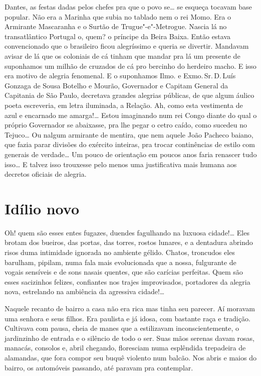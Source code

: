 Dantes, as festas dadas pelos chefes pra que o povo se\ldots{} se esqueça
tocavam base popular. Não era a Marinha que subia no tablado nem o rei
Momo. Era o Armirante Mascaranha e o Surtão de Trugue"-e"-Metrogue. Nascia
lá no transatlântico Portugal o, quem? o príncipe da Beira Baixa. Então
estava convencionado que o brasileiro ficou alegríssimo e queria se
divertir. Mandavam avisar de lá que os coloniais de cá tinham que mandar
pra lá um presente de suponhamos um milhão de cruzados de cá pro
bercinho do herdeiro macho. E isso era motivo de alegria fenomenal. E o
suponhamos Ilmo. e Exmo.\,Sr.\,D.\,Luís Gonzaga de Sousa Botelho e Mourão,
Governador e Capitam General da Capitania de São Paulo, decretava
grandes alegrias públicas, de que algum áulico poeta escreveria, em
letra iluminada, a Relação. Ah, como esta vestimenta de azul e encarnado
me amarga!\ldots{} Estou imaginando num rei Congo diante do qual o próprio
Governador se abaixasse, pra lhe pegar o cetro caído, como sucedeu no
Tejuco\ldots{} Ou nalgum armirante de mentira, que nem aquele João Pacheco
baiano, que fazia parar divisões do exército inteiras, pra trocar
continências de estilo com generais de verdade\ldots{} Um pouco de orientação
em poucos anos faria renascer tudo isso\ldots{} E talvez isso trouxesse pelo
menos uma justificativa mais humana aos decretos oficiais de alegria.

\chapter{Idílio novo}

Oh! quem são esses entes fugazes, duendes fagulhando na luxuosa
cidade!\ldots{} Eles brotam dos bueiros, das portas, das torres, rostos
lunares, e a dentadura abrindo risos duma intimidade ignorada no
ambiente gélido. Chatos, troncudos eles barulham, pipilam, numa fala
mais evolucionada que a nossa, fulgurante de vogais sensíveis e de sons
nasais quentes, que são carícias perfeitas. Quem são esses sacizinhos
felizes, confiantes nos trajes improvisados, portadores da alegria nova,
estrelando na ambiência da agressiva cidade!\ldots{}

Naquele recanto de bairro a casa não era rica mas tinha seu parecer. Aí
moravam uma senhora e seus filhos. Era paulista e já idosa, com bastante
raça e tradição. Cultivava com pausa, cheia de manes que a estilizavam
inconscientemente, o jardinzinho de entrada e o silêncio de todo o ser.
Suas mãos serenas davam rosas, manacás, consolos e, abril chegando,
floresciam numa esplêndida trepadeira de alamandas, que fora compor seu
buquê violento num balcão. Nos abris e maios do bairro, os automóveis
passando, até paravam pra contemplar.

